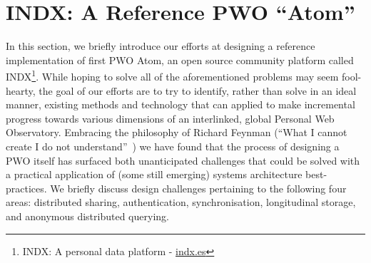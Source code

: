 \documentclass{sig-alternate}
\begin{document}


\section{INDX: A Reference PWO ``Atom''}

In this section, we briefly introduce our efforts at designing a reference implementation of first PWO Atom, an open source community platform called INDX\footnote{INDX: A personal data platform - \url{indx.es}}.  While hoping to solve all of the aforementioned problems may seem fool-hearty, the goal of our efforts are to try to identify, rather than solve in an ideal manner, existing methods and technology that can applied to  make incremental progress towards various dimensions of an interlinked, global Personal Web Observatory.  Embracing the philosophy of Richard Feynman (``What I cannot create I do not understand''~\cite{feynman1982simulating}) we have found that the process of designing a PWO itself has surfaced both unanticipated challenges that could be solved with a practical application of (some still emerging) systems architecture best-practices.  We briefly discuss design challenges pertaining to the following four areas: distributed sharing, authentication, synchronisation, longitudinal storage, and anonymous distributed querying.
\end{document}
